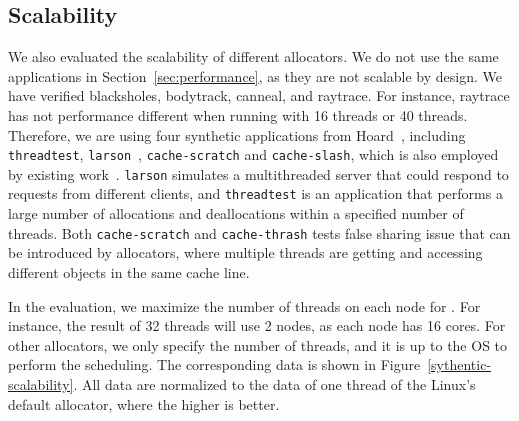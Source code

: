 \subsection{Scalability}
\label{sec:scale}

We also evaluated the scalability of different allocators. We do not use the same applications in Section~\ref{sec:performance}, as they are not scalable by design. We have verified blacksholes, bodytrack, canneal, and raytrace. For instance, raytrace has not performance different when running with 16 threads or 40 threads. Therefore, we are using four synthetic applications from Hoard~\cite{Hoard}, including \texttt{threadtest}, \texttt{larson}~\cite{Larson}, \texttt{cache-scratch} and \texttt{cache-slash}, which is also employed by existing work~\cite{Scalloc}. \texttt{larson} simulates a multithreaded server that could respond to requests from different clients, and \texttt{threadtest} is an application that performs a large number of allocations and deallocations within a specified number of threads. Both \texttt{cache-scratch} and \texttt{cache-thrash} tests false sharing issue that can be introduced by allocators, where  multiple threads are getting and accessing different objects in the same cache line. 

In the evaluation, we maximize the number of threads on each node for \NM{}. For instance, the result of 32 threads will use 2 nodes, as each node has 16 cores. For other allocators, we only specify the number of threads, and it is up to the OS to perform the scheduling. The corresponding data is shown in Figure~\ref{sythentic-scalability}. All data are normalized to the data of one thread of the Linux's default allocator, where the higher is better.  

